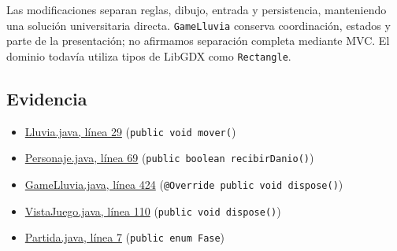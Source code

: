 Las modificaciones separan reglas, dibujo, entrada y persistencia, manteniendo una solución universitaria directa. \texttt{GameLluvia} conserva coordinación, estados y parte de la presentación; no afirmamos separación completa mediante MVC. El dominio todavía utiliza tipos de LibGDX como \texttt{Rectangle}.

\subsection*{Evidencia}
\begin{itemize}
\item \href{https://github.com/maverick1006/Proyecto-Game-LLuvia-/blob/entrega-final/core/src/main/java/puppy/code/Lluvia.java#L29}{Lluvia.java, línea 29} (\texttt{public void mover(})
\item \href{https://github.com/maverick1006/Proyecto-Game-LLuvia-/blob/entrega-final/core/src/main/java/puppy/code/Personaje.java#L69}{Personaje.java, línea 69} (\texttt{public boolean recibirDanio()})
\item \href{https://github.com/maverick1006/Proyecto-Game-LLuvia-/blob/entrega-final/core/src/main/java/puppy/code/GameLluvia.java#L424}{GameLluvia.java, línea 424} (\texttt{@Override public void dispose()})
\item \href{https://github.com/maverick1006/Proyecto-Game-LLuvia-/blob/entrega-final/core/src/main/java/puppy/code/VistaJuego.java#L110}{VistaJuego.java, línea 110} (\texttt{public void dispose()})
\item \href{https://github.com/maverick1006/Proyecto-Game-LLuvia-/blob/entrega-final/core/src/main/java/puppy/code/Partida.java#L7}{Partida.java, línea 7} (\texttt{public enum Fase})
\end{itemize}

